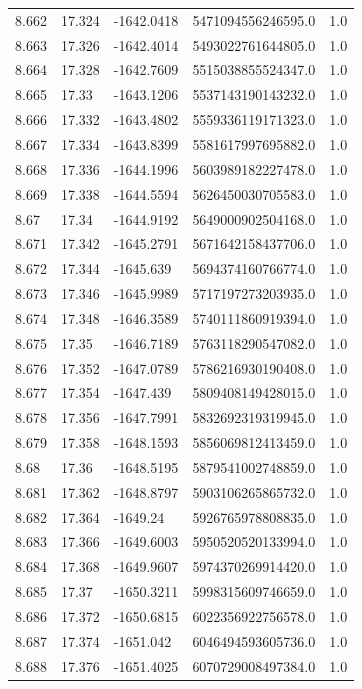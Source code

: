 \begin{tabular}{lllll}
8.662 & 17.324 & -1642.0418 & 5471094556246595.0 & 1.0 \\
8.663 & 17.326 & -1642.4014 & 5493022761644805.0 & 1.0 \\
8.664 & 17.328 & -1642.7609 & 5515038855524347.0 & 1.0 \\
8.665 & 17.33 & -1643.1206 & 5537143190143232.0 & 1.0 \\
8.666 & 17.332 & -1643.4802 & 5559336119171323.0 & 1.0 \\
8.667 & 17.334 & -1643.8399 & 5581617997695882.0 & 1.0 \\
8.668 & 17.336 & -1644.1996 & 5603989182227478.0 & 1.0 \\
8.669 & 17.338 & -1644.5594 & 5626450030705583.0 & 1.0 \\
8.67 & 17.34 & -1644.9192 & 5649000902504168.0 & 1.0 \\
8.671 & 17.342 & -1645.2791 & 5671642158437706.0 & 1.0 \\
8.672 & 17.344 & -1645.639 & 5694374160766774.0 & 1.0 \\
8.673 & 17.346 & -1645.9989 & 5717197273203935.0 & 1.0 \\
8.674 & 17.348 & -1646.3589 & 5740111860919394.0 & 1.0 \\
8.675 & 17.35 & -1646.7189 & 5763118290547082.0 & 1.0 \\
8.676 & 17.352 & -1647.0789 & 5786216930190408.0 & 1.0 \\
8.677 & 17.354 & -1647.439 & 5809408149428015.0 & 1.0 \\
8.678 & 17.356 & -1647.7991 & 5832692319319945.0 & 1.0 \\
8.679 & 17.358 & -1648.1593 & 5856069812413459.0 & 1.0 \\
8.68 & 17.36 & -1648.5195 & 5879541002748859.0 & 1.0 \\
8.681 & 17.362 & -1648.8797 & 5903106265865732.0 & 1.0 \\
8.682 & 17.364 & -1649.24 & 5926765978808835.0 & 1.0 \\
8.683 & 17.366 & -1649.6003 & 5950520520133994.0 & 1.0 \\
8.684 & 17.368 & -1649.9607 & 5974370269914420.0 & 1.0 \\
8.685 & 17.37 & -1650.3211 & 5998315609746659.0 & 1.0 \\
8.686 & 17.372 & -1650.6815 & 6022356922756578.0 & 1.0 \\
8.687 & 17.374 & -1651.042 & 6046494593605736.0 & 1.0 \\
8.688 & 17.376 & -1651.4025 & 6070729008497384.0 & 1.0 \\

\end{tabular}
